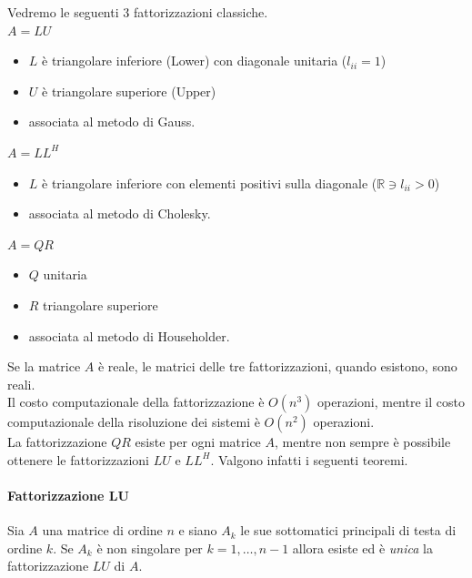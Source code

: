 Vedremo le seguenti 3 fattorizzazioni classiche. \\

$A = LU$
\begin{itemize}
\item $L$ \`e triangolare inferiore (Lower) con diagonale unitaria ($l_{ii}=1$)
\item $U$ \`e triangolare superiore (Upper)
\item associata al metodo di Gauss.
\end{itemize}

$A = LL^{H}$
\begin{itemize}
\item $L$ \`e triangolare inferiore con elementi positivi sulla
  diagonale ($\mathbb{R} \ni l_{ii}>0$)
\item associata al metodo di Cholesky.
\end{itemize}

$A = QR$
\begin{itemize}
\item $Q$ unitaria 
\item $R$ triangolare superiore
\item associata al metodo di Householder.
\end{itemize}

Se la matrice $A$ \`e reale, le matrici delle tre fattorizzazioni, quando
esistono, sono reali.\\
Il costo computazionale della fattorizzazione \`e $O(n^3)$ operazioni,
mentre il costo computazionale della risoluzione dei sistemi \`e
$O(n^2)$ operazioni.\\
La fattorizzazione $QR$ esiste per ogni matrice $A$, mentre non sempre \`e
possibile ottenere le fattorizzazioni $LU$ e $LL^H$. Valgono infatti i
seguenti teoremi.

\paragraph{Fattorizzazione LU}
\begin{theo}[Esistenza della fattorizzazione $A=LU$]\label{th:LU}
Sia $A$ una matrice di ordine $n$ e siano $A_k$ le sue sottomatici
principali di testa di ordine $k$. Se $A_k$ \`e non singolare per
$k=1,\ldots,n-1$ allora esiste ed \`e \emph{unica} la fattorizzazione
$LU$ di $A$.
\end{theo}

